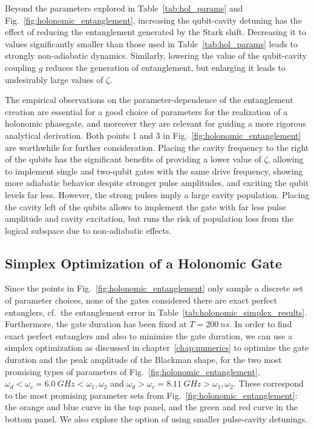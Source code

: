Beyond the parameters explored in Table~\ref{tab:hol_params} and
Fig.~\ref{fig:holonomic_entanglement}, increasing the qubit-cavity
detuning has the effect of reducing the entanglement generated by the Stark
shift. Decreasing it to values significantly smaller than those used in
Table~\ref{tab:hol_params} leads to strongly non-adiabatic dynamics.
Similarly, lowering the value of the qubit-cavity coupling $g$ reduces the
generation of entanglement, but enlarging it leads to undesirably large values
of $\zeta$.

\enlargethispage{\baselineskip}
The empirical observations on the parameter-dependence of the entanglement
creation are essential for a good choice of parameters for the realization of
a holonomic phasegate, and moreover they are relevant for guiding a more
rigorous analytical derivation. Both points 1 and 3 in
Fig.~\ref{fig:holonomic_entanglement} are worthwhile for further consideration.
Placing the cavity frequency to the right of the qubits has the significant
benefits of providing a lower value of $\zeta$, allowing to implement single and
two-qubit gates with the same drive frequency, showing more adiabatic behavior
despite stronger pulse amplitudes, and exciting the qubit levels far less.
However, the strong pulses imply a large cavity population. Placing the cavity
left of the qubits allows to implement the gate with far less pulse amplitude
and cavity excitation, but runs the risk of population loss from the logical
subspace due to non-adiabatic effects.


\subsection{Simplex Optimization of a Holonomic Gate}
\label{subsec:hol_simplex}

Since the points in Fig.~\ref{fig:holonomic_entanglement} only sample
a discrete set of parameter choices, none of the gates considered there are
exact perfect entanglers, cf.\ the entanglement error in
Table~\ref{tab:holonomic_simplex_results}.
Furthermore, the gate duration has been fixed at $T=\SI{200}{ns}$. In order to
find exact perfect entanglers and also to minimize the gate duration, we can use
a simplex optimization as discussed in chapter~\ref{chap:numerics} to optimize
the gate duration and the peak amplitude of the Blackman shape, for the two most
promising types of parameters of Fig.~\ref{fig:holonomic_entanglement},
$\omega_d < \omega_c=\SI{6.0}{GHz} < \omega_1, \omega_2$ and
$\omega_d > \omega_c=\SI{8.11}{GHz} > \omega_1, \omega_2$.
These correspond to the most promising parameter sets from
Fig.~\ref{fig:holonomic_entanglement}: the orange and blue curve in the top
panel, and the green and red curve in the bottom panel.
We also explore the option of using smaller pulse-cavity detunings.

